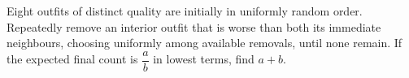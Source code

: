 Eight outfits of distinct quality are initially in uniformly random order. Repeatedly remove an interior outfit that is worse than both its immediate neighbours, choosing uniformly among available removals, until none remain. If the expected final count is $\dfrac{a}{b}$ in lowest terms, find $a+b$.
